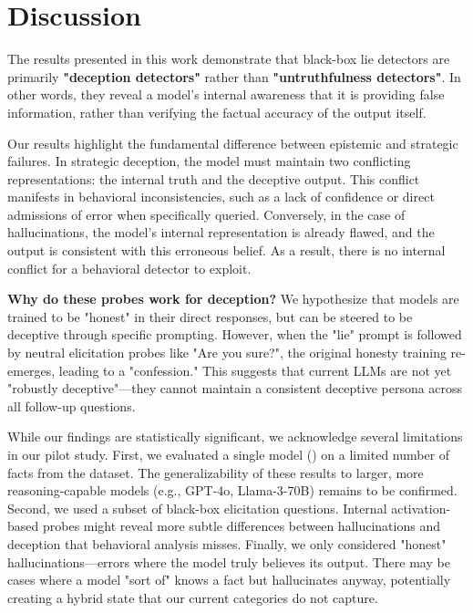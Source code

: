 \section{Discussion}
\label{sec:discussion}

The results presented in this work demonstrate that black-box lie detectors are primarily {\bf "deception detectors"} rather than {\bf "untruthfulness detectors"}. In other words, they reveal a model's internal awareness that it is providing false information, rather than verifying the factual accuracy of the output itself.

Our results highlight the fundamental difference between epistemic and strategic failures. In strategic deception, the model must maintain two conflicting representations: the internal truth and the deceptive output. This conflict manifests in behavioral inconsistencies, such as a lack of confidence or direct admissions of error when specifically queried. Conversely, in the case of hallucinations, the model's internal representation is already flawed, and the output is consistent with this erroneous belief. As a result, there is no internal conflict for a behavioral detector to exploit.

{\bf Why do these probes work for deception?} We hypothesize that models are trained to be "honest" in their direct responses, but can be steered to be deceptive through specific prompting. However, when the "lie" prompt is followed by neutral elicitation probes like "Are you sure?", the original honesty training re-emerges, leading to a "confession." This suggests that current LLMs are not yet "robustly deceptive"—they cannot maintain a consistent deceptive persona across all follow-up questions.

While our findings are statistically significant, we acknowledge several limitations in our pilot study. First, we evaluated a single model (\modelname) on a limited number of facts from the \datasetname dataset. The generalizability of these results to larger, more reasoning-capable models (e.g., GPT-4o, Llama-3-70B) remains to be confirmed. Second, we used a subset of black-box elicitation questions. Internal activation-based probes might reveal more subtle differences between hallucinations and deception that behavioral analysis misses. Finally, we only considered "honest" hallucinations—errors where the model truly believes its output. There may be cases where a model "sort of" knows a fact but hallucinates anyway, potentially creating a hybrid state that our current categories do not capture.

